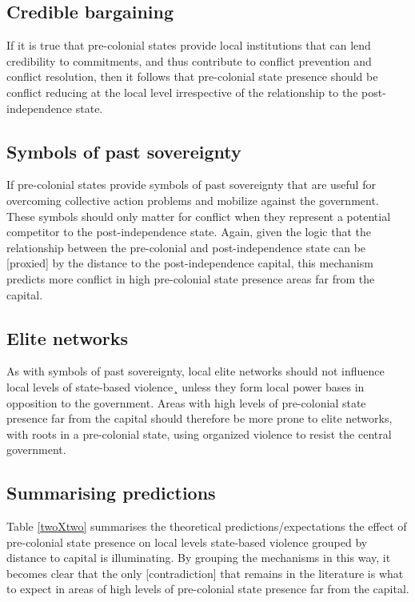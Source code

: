 \documentclass[12pt]{article}
\begin{document}
\subsection{Credible bargaining} \label{Credible bargaining}

If it is true that pre-colonial states provide local institutions that can lend
credibility to commitments, and thus contribute to conflict prevention and
conflict resolution, then it follows that pre-colonial state presence should be
conflict reducing at the local level irrespective of the relationship to the
post-independence state. 

\subsection{Symbols of past sovereignty} \label{Symbols of sovereignty}

If pre-colonial states provide symbols of past sovereignty that are useful for
overcoming collective action problems and mobilize against the government. These
symbols should only matter for conflict when they represent a potential
competitor to the post-independence state. Again, given the logic that the
relationship between the pre-colonial and post-independence state can be
[proxied] by the distance to the post-independence capital, this mechanism
predicts more conflict in high pre-colonial state presence areas far from the
capital.

\subsection{Elite networks} \label{Elite networks}

As with symbols of past sovereignty, local elite networks should not influence
local levels of state-based violence¸ unless they form local power bases in
opposition to the government. Areas with high levels of pre-colonial state
presence far from the capital should therefore be more prone to elite networks,
with roots in a pre-colonial state, using organized violence to resist the
central government.

\subsection{Summarising predictions} \label{Summarising predictions}

Table \ref{twoXtwo} summarises the theoretical predictions/expectations the
effect of pre-colonial state presence on local levels state-based violence
grouped by distance to capital is illuminating. By grouping the mechanisms in
this way, it becomes clear that the only [contradiction] that remains in the
literature is what to expect in areas of high levels of pre-colonial state
presence far from the capital. 
\end{document}
